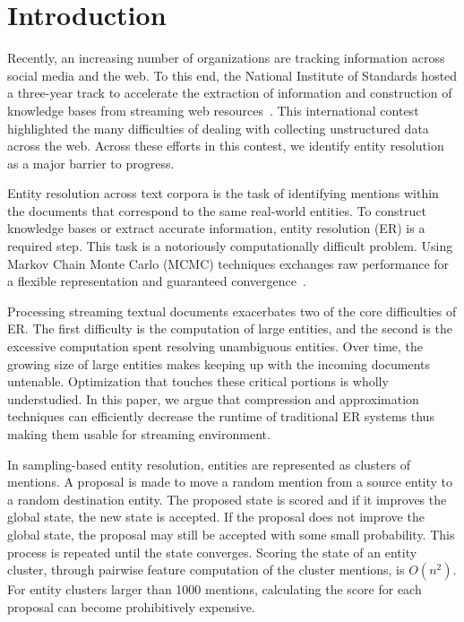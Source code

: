 
\section{Introduction}

Recently, an increasing number of organizations are tracking information across
social media and the web.
To this end, the National Institute of Standards hosted a three-year
track to accelerate the extraction of information and construction of knowledge bases from streaming web
resources~\cite{frank2013evaluating}.
This international contest highlighted the many difficulties of dealing with collecting 
unstructured data across the web.
Across these efforts in this contest, we identify entity resolution as a major barrier to progress. 


Entity resolution across text corpora is the task of identifying mentions 
within the documents that correspond to the same real-world entities.
To construct knowledge bases or extract accurate information, entity resolution (ER) is a required step.
This task is a notoriously computationally difficult problem.
Using Markov Chain Monte Carlo (MCMC) techniques exchanges raw performance for a flexible representation 
and guaranteed convergence~\cite{mccallum03towardconditional,singh2011large,wick2013discriminative}.

Processing streaming textual documents exacerbates two of the core difficulties of ER.\@
The first  difficulty is the computation of large entities, and the second is the  excessive computation spent resolving unambiguous entities.
Over time, the growing size of large entities makes keeping up with the incoming documents untenable.
Optimization that touches these critical portions is wholly understudied.
In this paper, we argue that compression and approximation 
techniques can efficiently decrease the runtime of traditional ER systems thus
making them usable for streaming environment.

In sampling-based entity resolution, entities are represented as clusters of mentions.
A proposal is made to move a random mention from a source entity to a random destination entity.
The proposed state is scored and if it improves the global state, the new state is accepted.
If the proposal does not improve the global state, the proposal may still be accepted with some small probability.
This process is repeated until the state converges.
Scoring the state of an entity cluster, through pairwise feature computation of the cluster mentions, is $O(n^2)$.
For entity clusters larger than 1000 mentions, calculating the score for each proposal can become prohibitively expensive.

